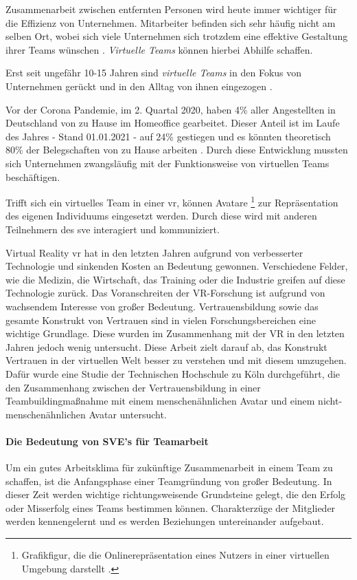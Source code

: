 \documentclass[a4paper,11pt]{article}%
\renewcommand{\\}{\vspace*{0.5\baselineskip} \newline}
\begin{document}
Zusammenarbeit zwischen entfernten Personen wird heute immer wichtiger für die Effizienz von Unternehmen. Mitarbeiter befinden sich sehr häufig nicht am selben Ort, wobei sich viele Unternehmen sich trotzdem eine effektive Gestaltung ihrer Teams wünschen \citep[S.791-792]{jarvenpaa1999communication}. \textit{Virtuelle Teams} können hierbei Abhilfe schaffen. 
	
Erst seit ungefähr 10-15 Jahren sind \textit{virtuelle Teams} in den Fokus von Unternehmen gerückt und in den Alltag von ihnen eingezogen \citep{gilson2015virtual}.

Vor der Corona Pandemie, im 2. Quartal 2020, haben 4\% aller Angestellten in Deutschland von zu Hause im Homeoffice gearbeitet. Dieser Anteil ist im Laufe des Jahres - Stand 01.01.2021 - auf 24\% gestiegen und es könnten theoretisch 80\% der Belegschaften von zu Hause arbeiten \citep{statistaCorona2020}. Durch diese Entwicklung mussten sich Unternehmen zwangsläufig mit der Funktionsweise von virtuellen Teams beschäftigen.

Trifft sich ein virtuelles Team in einer \ac{vr}, können Avatare \footnote{Grafikfigur, die die Onlinerepräsentation eines Nutzers in einer virtuellen Umgebung darstellt \citep[S.1]{neustaedter2009presenting}.} zur Repräsentation des eigenen Individuums eingesetzt werden. Durch diese wird mit anderen Teilnehmern des \ac{sve} interagiert und kommuniziert.

Virtual Reality \ac{vr} hat in den letzten Jahren aufgrund von verbesserter Technologie und sinkenden Kosten an Bedeutung gewonnen. Verschiedene Felder, wie die Medizin, die Wirtschaft, das Training oder die Industrie greifen auf diese Technologie zurück. Das Voranschreiten der VR-Forschung ist aufgrund von wachsendem Interesse von großer Bedeutung. Vertrauensbildung sowie das gesamte Konstrukt von Vertrauen sind in vielen Forschungsbereichen eine wichtige Grundlage. Diese wurden im Zusammenhang mit der VR in den letzten Jahren jedoch wenig untersucht. Diese Arbeit zielt darauf ab, das Konstrukt Vertrauen in der virtuellen Welt besser zu verstehen und mit diesem umzugehen. Dafür wurde eine Studie der Technischen Hochschule zu Köln durchgeführt, die den Zusammenhang zwischen der Vertrauensbildung in einer Teambuildingmaßnahme mit einem menschenähnlichen Avatar und einem nicht-menschenähnlichen Avatar untersucht.

\paragraph{Die Bedeutung von SVE's für Teamarbeit}
	Um ein gutes Arbeitsklima für zukünftige Zusammenarbeit in einem Team zu schaffen, ist die Anfangsphase einer Teamgründung von großer Bedeutung. In dieser Zeit werden wichtige richtungsweisende Grundsteine gelegt, die den Erfolg oder Misserfolg eines Teams bestimmen können. Charakterzüge der Mitglieder werden kennengelernt und es werden Beziehungen untereinander aufgebaut.
	
\end{document}
